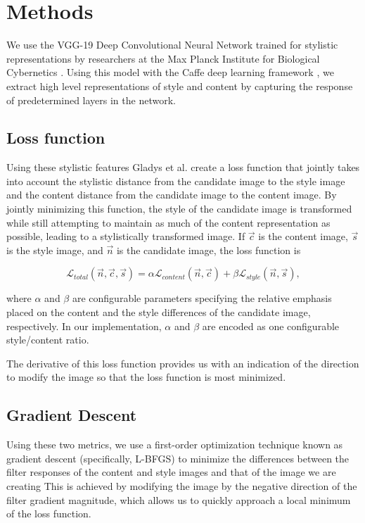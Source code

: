 \documentclass[11pt,letterpaper,journal]{IEEEtran}
\begin{document}
\section{Methods}

We use the VGG-19 Deep Convolutional Neural Network \cite{Simonyan14c} trained for stylistic
representations by researchers at the Max Planck Institute for Biological
Cybernetics \cite{gatys15}. Using this model with the Caffe deep
learning framework \cite{jia14}, we extract high level representations of style
and content by capturing the response of predetermined layers in the network.

\subsection{Loss function}

Using these stylistic features Gladys et al. create a loss function that jointly
takes into account the stylistic distance from the candidate image to the style
image and the content distance from the candidate image to the content image.
By jointly minimizing this function, the style of the candidate image is
transformed while still attempting to maintain as much of the content
representation as possible, leading to a stylistically transformed image. If
$\vec{c}$ is the content image, $\vec{s}$ is the style image, and $\vec{n}$ is
the candidate image, the loss function is

\begin{equation}
  \mathcal{L}_{total}(\vec{n}, \vec{c}, \vec{s}) = \alpha \mathcal{L}_{content}
  (\vec{n}, \vec{c}) + \beta \mathcal{L}_{style}(\vec{n}, \vec{s}),
\end{equation}

where $\alpha$ and $\beta$ are configurable parameters specifying the relative
emphasis placed on the content and the style differences of the candidate
image, respectively. In our implementation, $\alpha$ and $\beta$ are encoded as
one configurable style/content ratio.

The derivative of this loss function provides us with an indication of the
direction to modify the image so that the loss function is most minimized.

\subsection{Gradient Descent}

Using these two metrics, we use a first-order optimization
technique known as gradient descent (specifically, L-BFGS) to minimize the differences between the
filter responses of the content and style images and that of the image we are creating
This is achieved by modifying the image by the
negative direction of the filter gradient magnitude, which allows us to quickly
approach a local minimum of the loss function.
\end{document}
